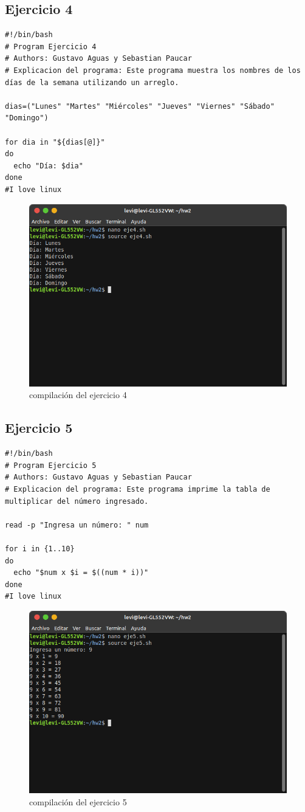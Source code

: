 \documentclass[11pt,twoside]{book}
\begin{document}
\subsection{Ejercicio 4}
\begin{lstlisting}
#!/bin/bash
# Program Ejercicio 4
# Authors: Gustavo Aguas y Sebastian Paucar
# Explicacion del programa: Este programa muestra los nombres de los días de la semana utilizando un arreglo.

dias=("Lunes" "Martes" "Miércoles" "Jueves" "Viernes" "Sábado" "Domingo")

for dia in "${dias[@]}"
do
  echo "Día: $dia"
done
#I love linux
\end{lstlisting}
\begin{figure}[h]
    \centering
    \includegraphics[width=0.8\linewidth]{Tarea2/teje4.png}
    \caption{ compilación del ejercicio 4}
\end{figure}
\newpage
\subsection{Ejercicio 5}
\begin{lstlisting}
#!/bin/bash
# Program Ejercicio 5
# Authors: Gustavo Aguas y Sebastian Paucar
# Explicacion del programa: Este programa imprime la tabla de multiplicar del número ingresado.

read -p "Ingresa un número: " num

for i in {1..10}
do
  echo "$num x $i = $((num * i))"
done
#I love linux
\end{lstlisting}
\begin{figure}[h]
    \centering
    \includegraphics[width=0.8\linewidth]{Tarea2/teje5.png}
    \caption{ compilación del ejercicio 5}
\end{figure}
\newpage
\end{document}
